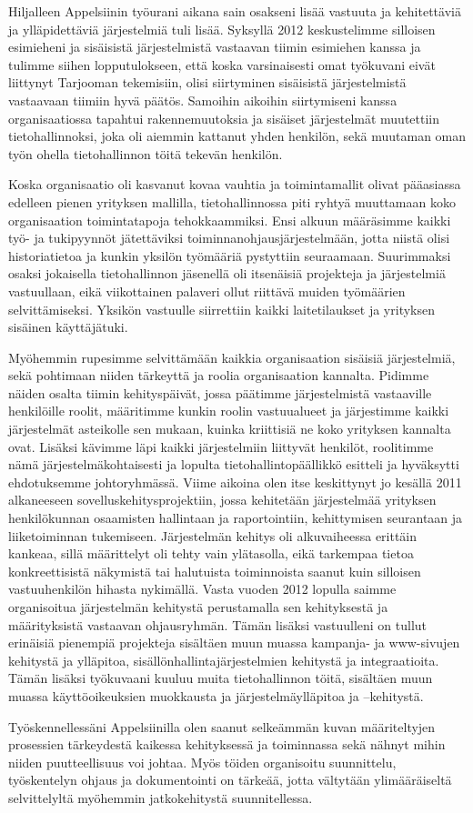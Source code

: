 \documentclass[a4paper,finnish,12pt]{article}
\begin{document}
Hiljalleen Appelsiinin työurani aikana sain osakseni lisää vastuuta ja kehitettäviä ja ylläpidettäviä järjestelmiä tuli lisää. Syksyllä 2012 keskustelimme silloisen esimieheni ja sisäisistä järjestelmistä vastaavan tiimin esimiehen kanssa ja tulimme siihen lopputulokseen, että koska varsinaisesti omat työkuvani eivät liittynyt Tarjooman tekemisiin, olisi siirtyminen sisäisistä järjestelmistä vastaavaan tiimiin hyvä päätös. Samoihin aikoihin siirtymiseni kanssa organisaatiossa tapahtui rakennemuutoksia ja sisäiset järjestelmät muutettiin tietohallinnoksi, joka oli aiemmin kattanut yhden henkilön, sekä muutaman oman työn ohella tietohallinnon töitä tekevän henkilön.

Koska organisaatio oli kasvanut kovaa vauhtia ja toimintamallit olivat pääasiassa edelleen pienen yrityksen mallilla, tietohallinnossa piti ryhtyä muuttamaan koko organisaation toimintatapoja tehokkaammiksi. Ensi alkuun määräsimme kaikki työ- ja tukipyynnöt jätettäviksi toiminnanohjausjärjestelmään, jotta niistä olisi historiatietoa ja kunkin yksilön työmääriä pystyttiin seuraamaan. Suurimmaksi osaksi jokaisella tietohallinnon jäsenellä oli itsenäisiä projekteja ja järjestelmiä vastuullaan, eikä viikottainen palaveri ollut riittävä muiden työmäärien selvittämiseksi. Yksikön vastuulle siirrettiin kaikki laitetilaukset ja yrityksen sisäinen käyttäjätuki.

Myöhemmin rupesimme selvittämään kaikkia organisaation sisäisiä järjestelmiä, sekä pohtimaan niiden tärkeyttä ja roolia organisaation kannalta. Pidimme näiden osalta tiimin kehityspäivät, jossa päätimme järjestelmistä vastaaville henkilöille roolit, määritimme kunkin roolin vastuualueet ja järjestimme kaikki järjestelmät asteikolle sen mukaan, kuinka kriittisiä ne koko yrityksen kannalta ovat. Lisäksi kävimme läpi kaikki järjestelmiin liittyvät henkilöt, roolitimme nämä järjestelmäkohtaisesti ja lopulta tietohallintopäällikkö esitteli ja hyväksytti ehdotuksemme johtoryhmässä.
Viime aikoina olen itse keskittynyt jo kesällä 2011 alkaneeseen sovelluskehitysprojektiin, jossa kehitetään järjestelmää yrityksen henkilökunnan osaamisten hallintaan ja raportointiin, kehittymisen seurantaan ja liiketoiminnan tukemiseen. Järjestelmän kehitys oli alkuvaiheessa erittäin kankeaa, sillä määrittelyt oli tehty vain ylätasolla, eikä tarkempaa tietoa konkreettisistä näkymistä tai halutuista toiminnoista saanut kuin silloisen vastuuhenkilön hihasta nykimällä. Vasta vuoden 2012 lopulla saimme organisoitua järjestelmän kehitystä perustamalla sen kehityksestä ja määrityksistä vastaavan ohjausryhmän. Tämän lisäksi vastuulleni on tullut erinäisiä pienempiä projekteja sisältäen muun muassa kampanja- ja www-sivujen kehitystä ja ylläpitoa,  sisällönhallintajärjestelmien kehitystä ja integraatioita. Tämän lisäksi työkuvaani kuuluu muita tietohallinnon töitä, sisältäen muun muassa käyttöoikeuksien muokkausta ja järjestelmäylläpitoa ja –kehitystä.

Työskennellessäni Appelsiinilla olen saanut selkeämmän kuvan määriteltyjen prosessien tärkeydestä kaikessa kehityksessä ja toiminnassa \textendash sekä nähnyt mihin niiden puutteellisuus voi johtaa. Myös töiden organisoitu suunnittelu, työskentelyn ohjaus ja dokumentointi on tärkeää, jotta vältytään ylimääräiseltä selvittelyltä myöhemmin jatkokehitystä suunnitellessa. 
\end{document}
